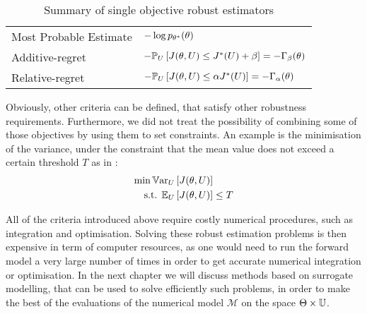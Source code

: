 \documentclass[../../Main_ManuscritThese.tex]{subfiles}
\begin{document}
\begin{table}[ht]
\begin{tabular}{ll}
    Most Probable Estimate        & $-\log p_{\theta^*}(\theta)$                                                                                                 \\
    Additive-regret               & $-\mathbb{P}_{U}\left[J(\theta, U) \leq J^*(U) + \beta \right]=-\Gamma_{\beta}(\theta)$                                     \\
    Relative-regret               & $-\mathbb{P}_{U}\left[J(\theta, U) \leq \alpha J^*(U) \right]=-\Gamma_{\alpha}(\theta) $                                    \\ \bottomrule
  \end{tabular}
  \caption{\label{tab:summary_robust} Summary of single objective robust estimators}
\end{table}
 
Obviously, other criteria can be defined, that satisfy other
robustness requirements.  Furthermore, we did not treat the
possibility of combining some of those objectives by using them to set
constraints. An example is the minimisation of the variance, under the
constraint that the mean value does not exceed a certain threshold $T$
as in \cite{lehman_designing_2004}:
\begin{align*}
  \min \mathbb{V}\mathrm{ar}_{U}&\left[J(\theta, U)\right]  \\
  \text{s.t. } \mathbb{E}_{U}&\left[J(\theta, U)\right]   \leq T
\end{align*}

All of the criteria introduced above require costly numerical
procedures, such as integration and optimisation. Solving these robust
estimation problems is then expensive in term of computer resources,
as one would need to run the forward model a very large number of
times in order to get accurate numerical integration or
optimisation. In the next chapter we will discuss methods based on
surrogate modelling, that can be used to solve efficiently such
problems, in order to make the best of the evaluations of the
numerical model $\mathcal{M}$ on the space $\Theta \times\mathbb{U}$.

\markchapterend

\subfileLocal{
	\pagestyle{empty}
	
	
      }
\end{document}
